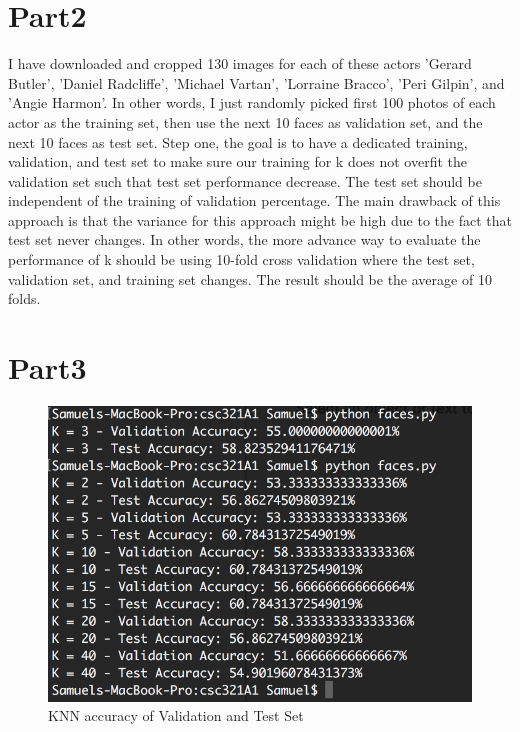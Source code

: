 \documentclass[12pt]{article} %
\begin{document}

\section{Part2} %

I have downloaded and cropped 130 images for each of these actors 'Gerard Butler', 'Daniel Radcliffe', 'Michael Vartan', 'Lorraine Bracco', 'Peri Gilpin’, and 'Angie Harmon’. In other words, I just randomly picked first 100 photos of each actor as the training set, then use the next 10 faces as validation set, and the next 10 faces as test set. Step one, the goal is to have a dedicated training, validation, and test set to make sure our training for k does not overfit the validation set such that test set performance decrease. The test set should be independent of the training of validation percentage. The main drawback of this approach is that the variance for this approach might be high due to the fact that test set never changes. In other words, the more advance way to evaluate the performance of k should be using 10-fold cross validation where the test set, validation set, and training set changes. The result should be the average of 10 folds. 


\section{Part3} %

\begin{figure}[H] %
  \centering 
  \begin{minipage}[b]{0.7\textwidth}
    \includegraphics[width=\textwidth]{part3_2}
    \caption{KNN accuracy of Validation and Test Set}
  \end{minipage}
\end{figure}
\end{document}

